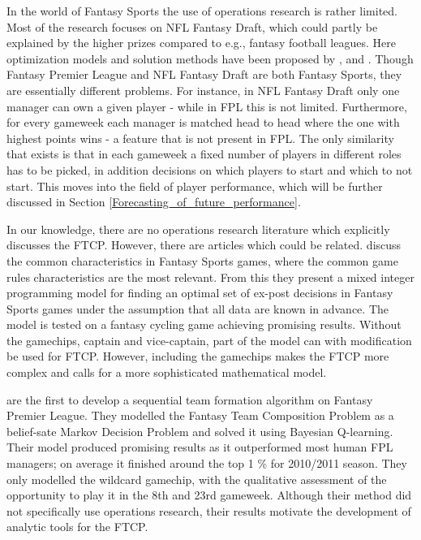 \begin{comment}
1. Bartsch 
2. Della 
3. Chilean 2007 og si at arbeidet ble jobbet videre med i 2012 cite. 
4. Goossens
5. Kendall 
6. Rasmussen 
7. Ribeiro 
\end{comment}
\newpar

In the world of Fantasy Sports the use of operations research is rather limited. Most of the research focuses on NFL Fantasy Draft, which could partly be explained by the higher prizes compared to e.g., fantasy football leagues. Here optimization models and solution methods have been proposed by \cite{Fry}, \cite{Gibson} and \cite{Becker}. Though Fantasy Premier League and NFL Fantasy Draft are both Fantasy Sports, they are essentially different problems. For instance, in NFL Fantasy Draft
only one manager can own a given player - while in FPL this is not limited. Furthermore, for every gameweek each manager is matched head to head where the one with highest points wins - a feature that is not present in FPL. The only similarity that exists is that in each gameweek a fixed number of players in different roles has to be picked, in addition decisions on which players to start and which to not start. This moves into the field of player performance, which will be further discussed in Section \ref{Forecasting_of_future_performance}.


\newpar

In our knowledge, there are no operations research literature which explicitly discusses the FTCP. However, there are articles which could be related. \cite{Mathsports} discuss the common characteristics in Fantasy Sports games, where the common game rules characteristics are the most relevant. From this they present a mixed integer programming model for finding an optimal set of ex-post decisions in Fantasy Sports games under the assumption that all data are known in advance. The model is tested on a fantasy cycling game achieving promising results. Without the gamechips, captain and vice-captain, part of the model can with modification be used for FTCP. However, including the gamechips makes the FTCP more complex and calls for a more sophisticated mathematical model. 

\newpar

\cite{Matthews} are the first to develop a sequential team formation algorithm on Fantasy Premier League. They modelled the Fantasy Team Composition Problem as a belief-sate Markov Decision Problem and solved it using Bayesian Q-learning. Their model produced promising results as it outperformed most human FPL managers; on average it finished around the top 1 \% for 2010/2011 season. They only modelled the wildcard gamechip, with the qualitative assessment of the opportunity to play it in the 8th and 23rd gameweek. Although their method did not specifically use operations research, their results motivate the development of analytic tools for the FTCP. 

